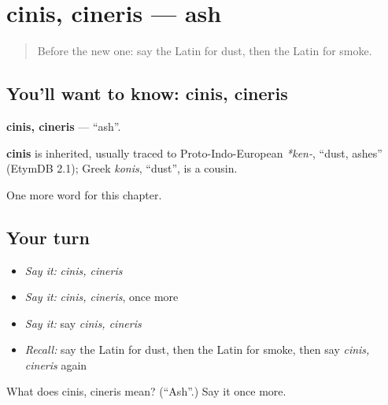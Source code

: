 \section[cinis, cineris]{cinis, cineris — ash}

\label{lesson:LA-C275-cinis}



\begin{quote}
Before the new one: say the Latin for dust, then the Latin for smoke.
\end{quote}

\subsection*{You'll want to know: cinis, cineris}
\textbf{cinis, cineris} — \textquotedblleft{}ash\textquotedblright{}.

\begin{cousinweb}
\textbf{cinis} is inherited, usually traced to Proto-Indo-European \emph{*ken-}, \textquotedblleft{}dust, ashes\textquotedblright{} (EtymDB 2.1); Greek \emph{konis}, \textquotedblleft{}dust\textquotedblright{}, is a cousin.
\end{cousinweb}

\begin{grammarlens}[title={What you've built}]
One more word for this chapter.
\end{grammarlens}

\subsection*{Your turn}
\begin{itemize}
\raggedright
  \item \emph{Say it:} \emph{cinis, cineris}
  \item \emph{Say it:} \emph{cinis, cineris}, once more
  \item \emph{Say it:} say \emph{cinis, cineris}
  \item \emph{Recall:} say the Latin for dust, then the Latin for smoke, then say \emph{cinis, cineris} again
\end{itemize}

\begin{tcolorbox}[breakable,colback=teal!4,colframe=teal!35!black,title={Before you move on}]
What does cinis, cineris mean? (\textquotedblleft{}Ash\textquotedblright{}.) Say it once more.
\end{tcolorbox}
